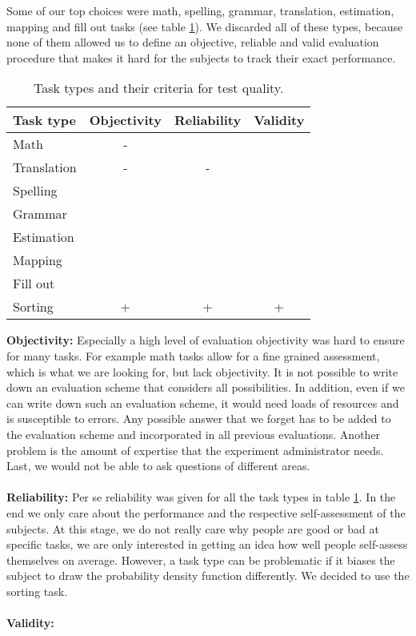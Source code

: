 \documentclass[../main/main.tex]{subfiles}
\begin{document}
	\noindent Some of our top choices were math, spelling, grammar, translation, estimation, mapping and fill out tasks (see table \ref{tab:task-types}). We discarded all of these types, because none of them allowed us to define an objective, reliable and valid evaluation procedure that makes it hard for the subjects to track their exact performance.
	
	\begin{table}[h]
		\centering

		\begin{tabular}{l|c|c|c}
			\textbf{Task type} & \textbf{Objectivity} & \textbf{Reliability} & \textbf{Validity} \\
			\hline
			Math & - & & \\
			Translation & - & - & \\
			Spelling & & & \\
			Grammar & & & \\
			Estimation & & & \\
			Mapping & & & \\
			Fill out & & & \\
			Sorting & + & + & + \\
		\end{tabular}
		 \captionsetup{justification=centering}
		 \label{tab:task-types}
		\caption{Task types and their criteria for test quality.}
	\end{table}	
	
	\noindent\textbf{Objectivity:} Especially a high level of evaluation objectivity was hard to ensure for many tasks. For example math tasks allow for a fine grained assessment, which is what we are looking for, but lack objectivity. It is not possible to write down an evaluation scheme that considers all possibilities. In addition, even if we can write down such an evaluation scheme, it would need loads of resources and is susceptible to errors. Any possible answer that we forget has to be added to the evaluation scheme and incorporated in all previous evaluations. Another problem is the amount of expertise that the experiment administrator needs. Last, we would not be able to ask questions of different areas.
	\\\\
	\noindent\textbf{Reliability:} Per se reliability was given for all the task types in table \ref{tab:task-types}. In the end we only care about the performance and the respective self-assessment of the subjects. At this stage, we do not really care why people are good or bad at specific tasks, we are only interested in getting an idea how well people self-assess themselves on average. However, a task type can be problematic if it biases the subject to draw the probability density function differently. We decided to use the sorting task. 
	\\\\
	\noindent\textbf{Validity:}
	
\end{document}
